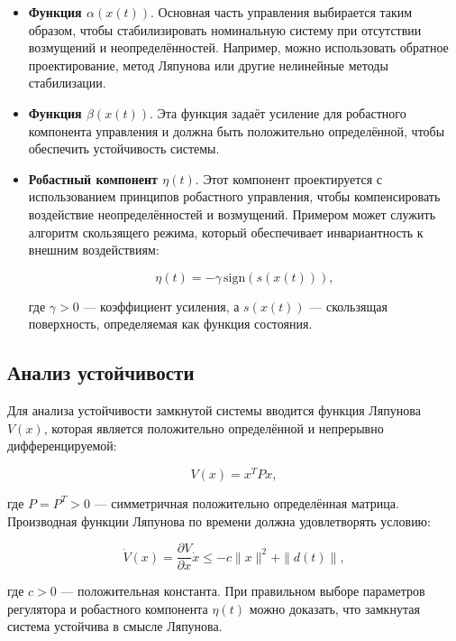 \documentclass[a4paper,14pt]{extarticle} %
\begin{document}
\begin{itemize}
    \item \textbf{Функция \( \alpha(x(t)) \)}. Основная часть управления выбирается таким образом, чтобы стабилизировать номинальную систему при отсутствии возмущений и неопределённостей. Например, можно использовать обратное проектирование, метод Ляпунова или другие нелинейные методы стабилизации.
    
    \item \textbf{Функция \( \beta(x(t)) \)}. Эта функция задаёт усиление для робастного компонента управления и должна быть положительно определённой, чтобы обеспечить устойчивость системы.
    
    \item \textbf{Робастный компонент \( \eta(t) \)}. Этот компонент проектируется с использованием принципов робастного управления, чтобы компенсировать воздействие неопределённостей и возмущений. Примером может служить алгоритм скользящего режима, который обеспечивает инвариантность к внешним воздействиям:
    
    \begin{equation}
        \eta(t) = -\gamma \, \text{sign}(s(x(t))),
    \end{equation}
    
    где \( \gamma > 0 \) — коэффициент усиления, а \( s(x(t)) \) — скользящая поверхность, определяемая как функция состояния.
\end{itemize}

\subsection*{Анализ устойчивости}

Для анализа устойчивости замкнутой системы вводится функция Ляпунова \( V(x) \), которая является положительно определённой и непрерывно дифференцируемой:

\begin{equation}
    V(x) = x^T P x,
\end{equation}

где \( P = P^T > 0 \) — симметричная положительно определённая матрица. Производная функции Ляпунова по времени должна удовлетворять условию:

\begin{equation}
    \dot{V}(x) = \frac{\partial V}{\partial x} \dot{x} \leq -c \|x\|^2 + \|d(t)\|,
\end{equation}

где \( c > 0 \) — положительная константа. При правильном выборе параметров регулятора и робастного компонента \( \eta(t) \) можно доказать, что замкнутая система устойчива в смысле Ляпунова.
\end{document}

